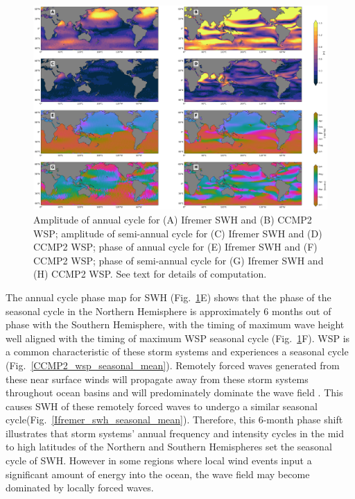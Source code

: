 \documentclass[12pt,twoside]{article}
\begin{document}
\begin{figure}[tbh]
\centering
\includegraphics[width=1.0\textwidth]{figs/lsf_parameters/ccmp2_ifremer_lsf_parameters_5_par_fit_paper.png}
\caption{Amplitude of annual cycle for (A) Ifremer SWH and (B) CCMP2 WSP; amplitude of semi-annual cycle for (C) Ifremer SWH and (D) CCMP2 WSP; phase of annual cycle for (E) Ifremer SWH and (F) CCMP2 WSP; phase of semi-annual cycle for (G) Ifremer SWH and (H) CCMP2 WSP.  See text for details of computation.}
\label{Ifremer_ccmp2_lsf_chars}
\end{figure}

The annual cycle phase map for SWH (Fig.~\ref{Ifremer_ccmp2_lsf_chars}E) shows that the phase of the seasonal cycle in the Northern Hemisphere is approximately 6 months out of phase with the Southern Hemisphere, with the timing of maximum wave height well aligned with the timing of maximum WSP seasonal cycle (Fig.~\ref{Ifremer_ccmp2_lsf_chars}F). WSP is a common characteristic of these storm systems and experiences a seasonal cycle (Fig.~\ref{CCMP2_wsp_seasonal_mean}). Remotely forced waves generated from these near surface winds will propagate away from these storm systems throughout ocean basins and will predominately dominate the wave field \cite{semedo2011global}. This causes SWH of these remotely forced waves to undergo a similar seasonal cycle(Fig.~\ref{Ifremer_swh_seasonal_mean}). Therefore, this 6-month phase shift illustrates that storm systems' annual frequency and intensity cycles in the mid to high latitudes of the Northern and Southern Hemispheres set the seasonal cycle of SWH. However in some regions where local wind events input a significant amount of energy into the ocean, the wave field may become dominated by locally forced waves.
\end{document}
